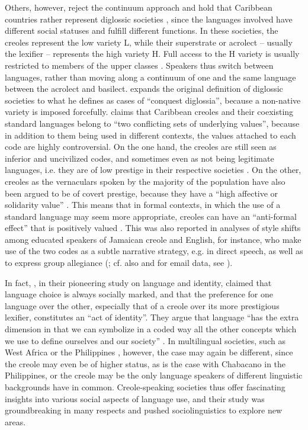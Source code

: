 \documentclass[output=paper]{langscibook}
\begin{document}
Others, however, reject the continuum approach and hold that Caribbean countries rather represent diglossic societies \citep[cf.][]{Ferguson1959}, since the languages involved have different social statuses and fulfill different functions. In these societies, the creoles represent the low variety L, while their superstrate or acrolect – usually the lexifier – represents the high variety H. Full access to the H variety is usually restricted to members of the upper classes \citep[cf.][]{winford1985concept}. Speakers thus switch between languages, rather than moving along a continuum of one and the same language between the acrolect and basilect. \citet{devonish2003language} expands the original definition of diglossic societies to what he defines as cases of “conquest diglossia”, because a non-native variety is imposed forcefully. \citet{winford1985concept} claims that Caribbean creoles and their coexisting standard languages belong to “two conflicting sets of underlying values”, because in addition to them being used in different contexts, the values attached to each code are highly controversial. On the one hand, the creoles are still seen as inferior and uncivilized codes, and sometimes even as not being legitimate languages, i.e. they are of low prestige in their respective societies \citep[cf.][]{rickfordetal1985symbol, patrick2008jamaican, kouwenbergetal2011linguistics}. On the other, creoles as the vernaculars spoken by the majority of the population have also been argued to be of covert prestige, because they have a “high affective or solidarity value” \citep[259]{rickfordetal1985symbol}. This means that in formal contexts, in which the use of a standard language may seem more appropriate, creoles can have an “anti-formal effect” that is positively valued \citep{allsopp1996dictionary}. This was also reported in analyses of style shifts among educated speakers of Jamaican creole and English, for instance, who make use of the two codes as a subtle narrative strategy, e.g. in direct speech, as well as to express group allegiance (\citealt{deuber2009english}; cf. also \citealt{patrick2008jamaican} and for email data, see \citealt{hinrichs2006code}). 

In fact, \citet{lepageetal1985acts}, in their pioneering study on language and identity, claimed that language choice is always socially marked, and that the preference for one language over the other, especially that of a creole over its more prestigious lexifier, constitutes an “act of identity”. They argue that language “has the extra dimension in that we can symbolize in a coded way all the other concepts which we use to define ourselves and our society” \citep[247-248]{lepageetal1985acts}. In multilingual societies, such as West Africa \citep{yakpo2017towards} or the Philippines \citep{leshoetal2013sociolinguistic}, however, the case may again be different, since the creole may even be of higher status, as is the case with Chabacano in the Philippines, or the creole may be the only language speakers of different linguistic backgrounds have in common. Creole-speaking societies thus offer fascinating insights into various social aspects of language use, and their study was groundbreaking in many respects and pushed sociolinguistics to explore new areas. 
\end{document}
